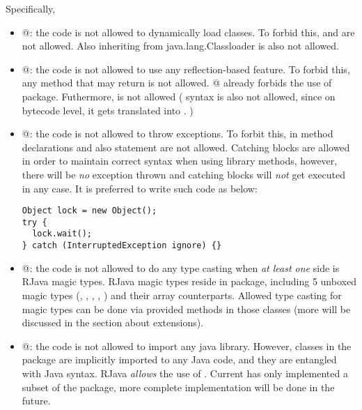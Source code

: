 \documentclass[12pt]{article}
\begin{document}
\noindent
Specifically, 
\begin{itemize}

\item
@: 
the code is not allowed to dynamically load classes. To forbid this, 
 and 
are not allowed. Also inheriting from {java.lang.Classloader} is also not allowed. 

\item
@: 
the code is not allowed to use any reflection-based feature. To forbid this,
any method that may return  is not allowed. 
@ already forbids the use of 
 package. Futhermore, 
is not allowed ( syntax is also not allowed, since 
on bytecode level, it gets translated into . )

\item
@:
the code is not allowed to throw exceptions. To forbit this, 
 in method declarations and also
 statement are not allowed. Catching blocks
are allowed in order to maintain correct syntax when using
library methods, however, there will be \emph{no} exception thrown and 
catching blocks will \emph{not}
get executed in any case. It is preferred to write such code
as below:
\begin{lstlisting}
Object lock = new Object();
try {
  lock.wait();
} catch (InterruptedException ignore) {}
\end{lstlisting}

\item
@:
the code is not allowed to do any type casting when 
\emph{at least one} side is RJava magic types. 
RJava magic types reside in 
package, including 5 unboxed magic types (, 
, , 
, ) and their array counterparts. 
Allowed type casting for magic types can be done via
provided methods in those classes 
(more will be discussed in the section about extensions). 

\item
@:
the code is not allowed to import any java library. However,
classes in the  package are implicitly 
imported to any Java code, and they are entangled
with Java syntax. RJava \emph{allows} the use of 
. Current \rjcfull has only implemented
a subset of the  package, 
more complete implementation will be done in the future. 


\end{itemize}
\end{document}
